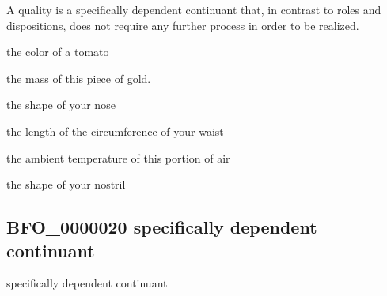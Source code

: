 \documentclass[letterpaper,10pt,english]{sphinxmanual}
\begin{document}
\begin{sphinxShadowBox}

\sphinxAtStartPar
{\hyperref[\detokenize{doc-BFO_0000017::doc}]{}}
\end{sphinxShadowBox}

\begin{sphinxShadowBox}

\sphinxAtStartPar
A quality is a specifically dependent continuant that, in contrast to roles and dispositions, does not require any further process in order to be realized.
\end{sphinxShadowBox}

\begin{sphinxShadowBox}

\sphinxAtStartPar
the color of a tomato

\sphinxAtStartPar
the mass of this piece of gold.

\sphinxAtStartPar
the shape of your nose

\sphinxAtStartPar
the length of the circumference of your waist

\sphinxAtStartPar
the ambient temperature of this portion of air

\sphinxAtStartPar
the shape of your nostril
\end{sphinxShadowBox}

\begin{sphinxShadowBox}

\sphinxAtStartPar
{}
\end{sphinxShadowBox}
\begin{quote}

\ignorespaces \end{quote}


\subsection{BFO\_0000020 \sphinxhyphen{} specifically dependent continuant}
\label{\detokenize{doc-BFO_0000020:bfo-0000020-specifically-dependent-continuant}}\label{\detokenize{doc-BFO_0000020:index-0}}\label{\detokenize{doc-BFO_0000020::doc}}
\begin{sphinxShadowBox}

\sphinxAtStartPar
specifically dependent continuant
\end{sphinxShadowBox}
\end{document}
